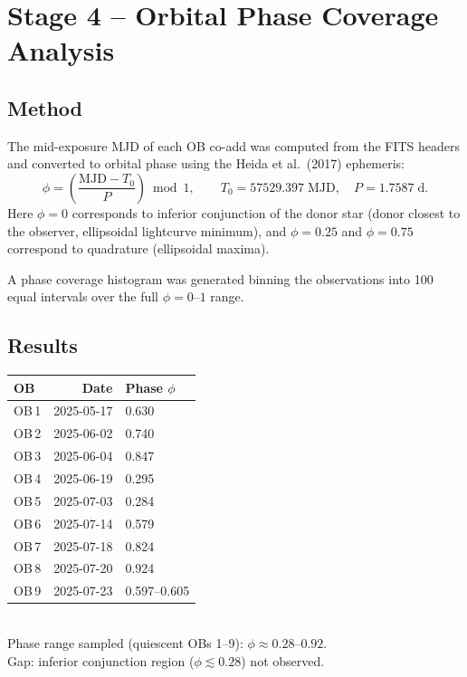 \documentclass[12pt,a4paper]{article}
\begin{document}
\section{Stage 4 -- Orbital Phase Coverage Analysis}

\subsection{Method}
The mid-exposure MJD of each OB co-add was computed from the FITS headers
and converted to orbital phase using the Heida et al.\ (2017) ephemeris:
\begin{equation}
  \phi = \left(\frac{\mathrm{MJD} - T_0}{P}\right) \bmod 1,
  \qquad T_0 = 57529.397\;\mathrm{MJD},\quad P = 1.7587\;\mathrm{d}.
\end{equation}
Here $\phi = 0$ corresponds to inferior conjunction of the donor star
(donor closest to the observer, ellipsoidal lightcurve minimum), and
$\phi = 0.25$ and $\phi = 0.75$ correspond to quadrature (ellipsoidal
maxima).

A phase coverage histogram was generated binning the observations into 100
equal intervals over the full $\phi = 0$--$1$ range.

\subsection{Results}

\begin{resultbox}
\begin{tabular}{lrl}
  \toprule
  OB & Date & Phase $\phi$ \\
  \midrule
  OB\,1  & 2025-05-17 & 0.630 \\
  OB\,2  & 2025-06-02 & 0.740 \\
  OB\,3  & 2025-06-04 & 0.847 \\
  OB\,4  & 2025-06-19 & 0.295 \\
  OB\,5  & 2025-07-03 & 0.284 \\
  OB\,6  & 2025-07-14 & 0.579 \\
  OB\,7  & 2025-07-18 & 0.824 \\
  OB\,8  & 2025-07-20 & 0.924 \\
  OB\,9  & 2025-07-23 & 0.597--0.605 \\
  \bottomrule
\end{tabular}\\[6pt]
Phase range sampled (quiescent OBs 1--9): $\phi \approx 0.28$--$0.92$.\\
Gap: inferior conjunction region ($\phi \lesssim 0.28$) not observed.
\end{resultbox}
\end{document}
